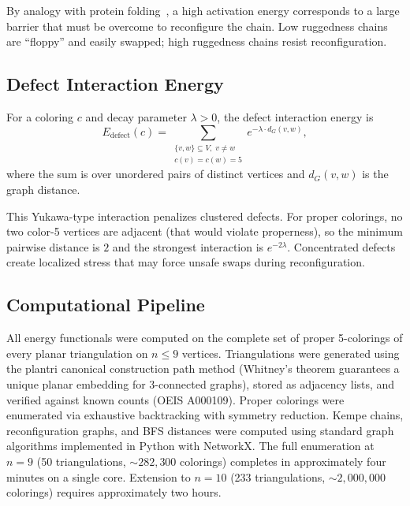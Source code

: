 By analogy with protein folding~\cite{levinthal1969}, a high activation
energy corresponds to a large barrier that must be overcome to
reconfigure the chain. Low ruggedness chains are ``floppy'' and easily
swapped; high ruggedness chains resist reconfiguration.

\subsection{Defect Interaction Energy}\label{sec:defect-energy}

\begin{definition}\label{def:defect-interaction}
For a coloring $c$ and decay parameter $\lambda > 0$, the defect
interaction energy is
\begin{equation}\label{eq:defect-interaction}
  E_{\text{defect}}(c) =
  \sum_{\substack{\{v, w\} \subseteq V,\; v \neq w \\ c(v) = c(w) = 5}}
  e^{-\lambda \cdot d_G(v, w)},
\end{equation}
where the sum is over unordered pairs of distinct vertices and
$d_G(v, w)$ is the graph distance.
\end{definition}

This Yukawa-type interaction penalizes clustered defects.
For proper colorings, no two color-5 vertices are adjacent (that would
violate properness), so the minimum pairwise distance is $2$ and the
strongest interaction is $e^{-2\lambda}$.
Concentrated defects create localized stress that may force unsafe
swaps during reconfiguration.

\subsection{Computational Pipeline}\label{sec:pipeline}

All energy functionals were computed on the complete set of proper
5-colorings of every planar triangulation on $n \leq 9$ vertices.
Triangulations were generated using the plantri canonical construction
path method (Whitney's theorem guarantees a unique planar embedding for
3-connected graphs), stored as adjacency lists, and verified against
known counts (OEIS A000109). Proper colorings were enumerated
via exhaustive backtracking with symmetry reduction. Kempe chains,
reconfiguration graphs, and BFS distances were computed using standard
graph algorithms implemented in Python with NetworkX. The full
enumeration at $n = 9$ (50 triangulations, ${\sim}282{,}300$
colorings) completes in approximately four minutes on a single core.
Extension to $n = 10$ (233 triangulations, ${\sim}2{,}000{,}000$
colorings) requires approximately two hours.
